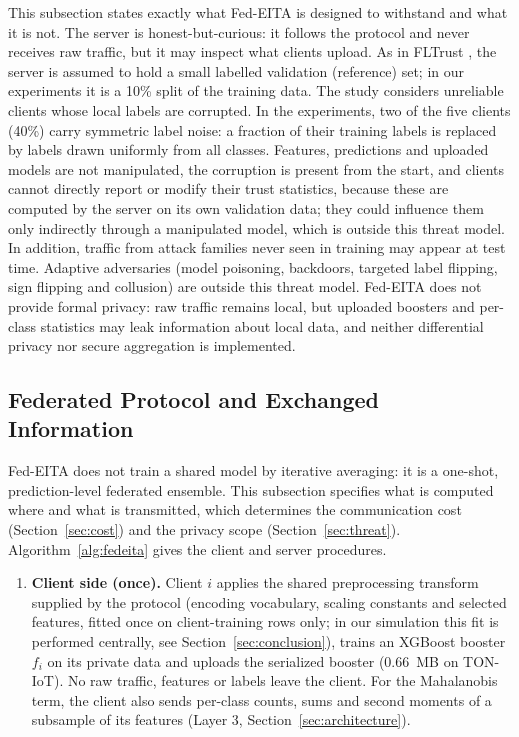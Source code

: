 \documentclass[pdflatex,sn-mathphys-num]{sn-jnl}
\begin{document}
{{\color{black}This subsection states exactly what Fed-EITA is designed to withstand and what it is not. The server is honest-but-curious: it follows the protocol and never receives raw traffic, but it may inspect what clients upload. As in FLTrust \cite{cao2021fltrust}, the server is assumed to hold a small labelled validation (reference) set; in our experiments it is a 10\% split of the training data. The study considers unreliable clients whose local labels are corrupted. In the experiments, two of the five clients (40\%) carry symmetric label noise: a fraction of their training labels is replaced by labels drawn uniformly from all classes. Features, predictions and uploaded models are not manipulated, the corruption is present from the start, and clients cannot directly report or modify their trust statistics, because these are computed by the server on its own validation data; they could influence them only indirectly through a manipulated model, which is outside this threat model. In addition, traffic from attack families never seen in training may appear at test time. Adaptive adversaries (model poisoning, backdoors, targeted label flipping, sign flipping and collusion) are outside this threat model. Fed-EITA does not provide formal privacy: raw traffic remains local, but uploaded boosters and per-class statistics may leak information about local data, and neither differential privacy nor secure aggregation is implemented.}
{\color{black}\subsection{Federated Protocol and Exchanged Information}\label{sec:protocol}
Fed-EITA does not train a shared model by iterative averaging: it is a one-shot, prediction-level federated ensemble. This subsection specifies what is computed where and what is transmitted, which determines the communication cost (Section~\ref{sec:cost}) and the privacy scope (Section~\ref{sec:threat}). Algorithm~\ref{alg:fedeita} gives the client and server procedures.
\begin{enumerate}
\item \textbf{Client side (once).} Client $i$ applies the shared preprocessing transform supplied by the protocol (encoding vocabulary, scaling constants and selected features, fitted once on client-training rows only; in our simulation this fit is performed centrally, see Section~\ref{sec:conclusion}), trains an XGBoost booster $f_i$ on its private data and uploads the serialized booster (0.66~MB on TON-IoT). No raw traffic, features or labels leave the client. For the Mahalanobis term, the client also sends per-class counts, sums and second moments of a subsample of its features (Layer 3, Section~\ref{sec:architecture}).

\end{enumerate}}}
\end{document}
